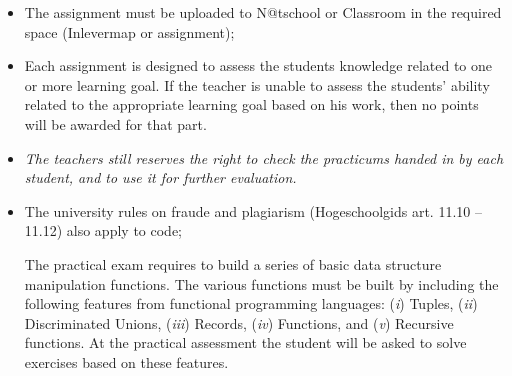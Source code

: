 \begin{itemize}
  \item The assignment must be uploaded to N@tschool or Classroom in the required space (Inlevermap or assignment);
  \item Each assignment is designed to assess the students knowledge related to one or more learning goal.
          If the teacher is unable to assess the students' ability related to the appropriate learning goal based on his work, then no points will be awarded for that part.
  \item \textit{The teachers still reserves the right to check the practicums handed in by each student, and to use it for further evaluation.}
  \item The university rules on fraude and plagiarism (Hogeschoolgids art. 11.10 -- 11.12) also apply to code;
  
The practical exam requires to build a series of basic data structure manipulation functions. The various functions must be built by including the following features from functional programming languages: (\textit{i}) Tuples, (\textit{ii}) Discriminated Unions, 
(\textit{iii}) Records, (\textit{iv}) Functions, and (\textit{v}) Recursive functions. At the practical assessment the student will be asked to solve exercises based on these features.

\end{itemize}
